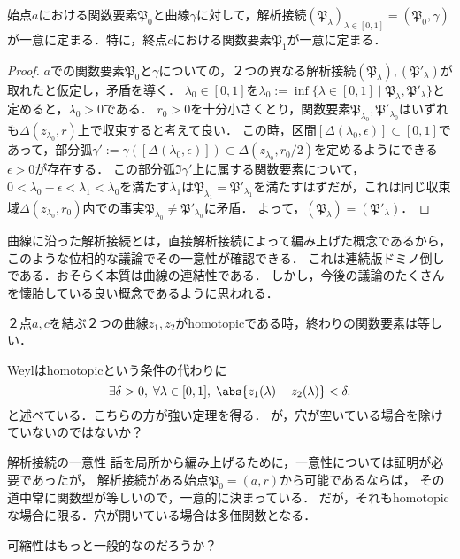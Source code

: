 \documentclass[uplatex, dvipdfmx]{jsreport}
\newcommand{\frakP}{\mathfrak{P}}
\begin{document}
\begin{proposition}[解析接続の一意性]
    始点$a$における関数要素$\frakP_0$と曲線$\gamma$に対して，解析接続$(\frakP_\lambda)_{\lambda\in[0,1]}=(\frakP_0,\gamma)$が一意に定まる．特に，終点$c$における関数要素$\frakP_1$が一意に定まる．
\end{proposition}
\begin{proof}
    $a$での関数要素$\frakP_0$と$\gamma$についての，２つの異なる解析接続$(\frakP_\lambda),(\frakP'_\lambda)$が取れたと仮定し，矛盾を導く．
    $\lambda_0\in[0,1]$を$\lambda_0:=\inf\{\lambda\in[0,1]\mid\frakP_\lambda,\frakP'_\lambda\}$と定めると，$\lambda_0>0$である．
    $r_0>0$を十分小さくとり，関数要素$\frakP_{\lambda_0},\frakP'_{\lambda_0}$はいずれも$\Delta(z_{\lambda_0},r)$上で収束すると考えて良い．
    この時，区間$[\Delta(\lambda_0,\epsilon)]\subset[0,1]$であって，部分弧$\gamma':=\gamma([\Delta(\lambda_0,\epsilon)])\subset\Delta(z_{\lambda_0},r_0/2)$を定めるようにできる$\epsilon>0$が存在する．
    この部分弧$\Im\gamma'$上に属する関数要素について，$0<\lambda_0-\epsilon<\lambda_1<\lambda_0$を満たす$\lambda_1$は$\frakP_{\lambda_1}=\frakP'_{\lambda_1}$を満たすはずだが，これは同じ収束域$\Delta(z_{\lambda_0},r_0)$内での事実$\frakP_{\lambda_0}\ne\frakP'_{\lambda_0}$に矛盾．
    よって，$(\frakP_\lambda)=(\frakP'_\lambda)$．
\end{proof}
\begin{remarks}[曲線の連結性]
    曲線に沿った解析接続とは，直接解析接続によって編み上げた概念であるから，このような位相的な議論でその一意性が確認できる．
    これは連続版ドミノ倒しである．おそらく本質は曲線の連結性である．
    しかし，今後の議論のたくさんを懐胎している良い概念であるように思われる．
\end{remarks}

\begin{proposition}[homotopy型の一意性]
    ２点$a,c$を結ぶ２つの曲線$z_1,z_2$がhomotopicである時，終わりの関数要素は等しい．
\end{proposition}
\begin{remark}
    Weylはhomotopicという条件の代わりに
    \[\exists\delta>0,\;\forall\lambda\in[0,1],\;\abs{z_1(\lambda)-z_2(\lambda)}<\delta.\]
    と述べている．こちらの方が強い定理を得る．
    が，穴が空いている場合を除けていないのではないか？
\end{remark}

\begin{itembox}[l]{解析接続の一意性}
    話を局所から編み上げるために，一意性については証明が必要であったが，
    解析接続がある始点$\frakP_0=(a,r)$から可能であるならば，
    その道中常に関数型が等しいので，一意的に決まっている．
    だが，それもhomotopicな場合に限る．穴が開いている場合は多価関数となる．

    可縮性はもっと一般的なのだろうか？
\end{itembox}
\end{document}
